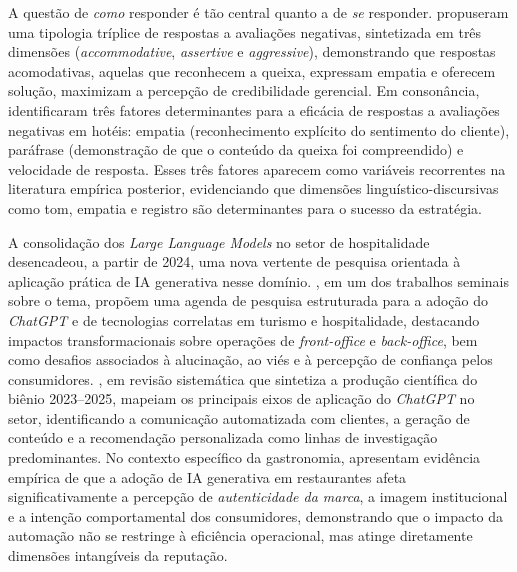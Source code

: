 \documentclass[12pt, a4paper]{article}
\numberwithin{equation}{section}
\begin{document}
A questão de \textit{como} responder é tão central quanto a de \textit{se} responder.  propuseram uma tipologia tríplice de respostas a avaliações negativas, sintetizada em três dimensões (\textit{accommodative}, \textit{assertive} e \textit{aggressive}), demonstrando que respostas acomodativas, aquelas que reconhecem a queixa, expressam empatia e oferecem solução, maximizam a percepção de credibilidade gerencial. Em consonância,  identificaram três fatores determinantes para a eficácia de respostas a avaliações negativas em hotéis: empatia (reconhecimento explícito do sentimento do cliente), paráfrase (demonstração de que o conteúdo da queixa foi compreendido) e velocidade de resposta. Esses três fatores aparecem como variáveis recorrentes na literatura empírica posterior, evidenciando que dimensões linguístico-discursivas como tom, empatia e registro são determinantes para o sucesso da estratégia.

A consolidação dos \textit{Large Language Models} no setor de hospitalidade desencadeou, a partir de 2024, uma nova vertente de pesquisa orientada à aplicação prática de IA generativa nesse domínio. , em um dos trabalhos seminais sobre o tema, propõem uma agenda de pesquisa estruturada para a adoção do \textit{ChatGPT} e de tecnologias correlatas em turismo e hospitalidade, destacando impactos transformacionais sobre operações de \textit{front-office} e \textit{back-office}, bem como desafios associados à alucinação, ao viés e à percepção de confiança pelos consumidores. , em revisão sistemática que sintetiza a produção científica do biênio 2023--2025, mapeiam os principais eixos de aplicação do \textit{ChatGPT} no setor, identificando a comunicação automatizada com clientes, a geração de conteúdo e a recomendação personalizada como linhas de investigação predominantes. No contexto específico da gastronomia,  apresentam evidência empírica de que a adoção de IA generativa em restaurantes afeta significativamente a percepção de \textit{autenticidade da marca}, a imagem institucional e a intenção comportamental dos consumidores, demonstrando que o impacto da automação não se restringe à eficiência operacional, mas atinge diretamente dimensões intangíveis da reputação.
\end{document}
